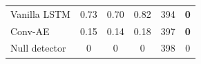 \begin{table}[H]
\begin{tabular}{l *3{S[table-format=3.2]} *2{S[table-format=3.0]}}
        Vanilla LSTM               & 0.73           & 0.70           & 0.82           & 394          & \textbf{0} \\
        Conv-AE                    & 0.15           & 0.14           & 0.18           & 397          & \textbf{0} \\
        \midrule
        Null detector              & 0              & 0              & 0              & 398          & 0          \\
        \bottomrule
    \end{tabular}
\end{table}

